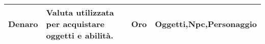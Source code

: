\begin{table}[h!]
\begin{adjustbox}{width=\textwidth}
\begin{tabular}{@{}llll@{}}
 \multicolumn{1}{|l|}{Denaro}                                    &  \multicolumn{1}{l|}{Valuta utilizzata per acquistare oggetti e abilità.}                                                                                                                                                                                                                                              &  \multicolumn{1}{|l|}{Oro}                                    &  \multicolumn{1}{l|}{Oggetti,Npc,Personaggio}                                                                                               \\ \midrule
\end{tabular}

\end{adjustbox}

\end{table}
